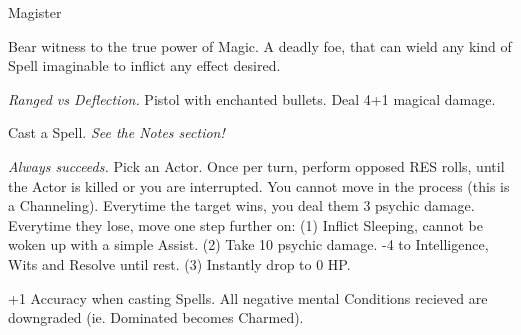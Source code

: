\begin{monsterboxbg}{Magister}

    Bear witness to the true power of Magic. A deadly foe, that can wield any kind of Spell imaginable to inflict any effect desired.
    
    \rpghline
    \stats[
        STR = \stat{12}, 
        DEX = \stat{14},
        CON = \stat{16},
        INT = \stat{20},
        WIS = \stat{16},
        CHA = \stat{16},
    ]
    \rpghline

    \basics[
    armorclass = 1,
    hitpoints  = 60,
    focus      = 12,
    defenses   = {Deflection 5, Reflex 5, Fortitude 6, Will 8}
    ]
    \rpghline

    \details[%
    skills = {Crafting 2, Kosmics 5, Lore 2},
    challenge = Elite,
    accuracies = {Melee 4, Ranged 6},
    ]
    \rpghline%
    

    \begin{rpg-monsteraction}
        \textit{Ranged vs Deflection.} Pistol with enchanted bullets. Deal 4+1 magical damage.
    \end{rpg-monsteraction}

    \begin{rpg-monsteraction}
        Cast a Spell. \textit{See the Notes section!}
    \end{rpg-monsteraction}

    \begin{rpg-monsteraction}[Nightmare]
        \textit{Always succeeds.} Pick an Actor. Once per turn, perform opposed RES rolls, until the Actor is killed or you are interrupted. You cannot move in the process (this is a Channeling). Everytime the target wins, you deal them 3 psychic damage. Everytime they lose, move one step further on: (1) Inflict Sleeping, cannot be woken up with a simple Assist. (2) Take 10 psychic damage. -4 to Intelligence, Wits and Resolve until rest. (3) Instantly drop to 0 HP.
    \end{rpg-monsteraction}



    \begin{rpg-monsteraction}
        +1 Accuracy when casting Spells. All negative mental Conditions recieved are downgraded (ie. Dominated becomes Charmed).
    \end{rpg-monsteraction}


\end{monsterboxbg}
